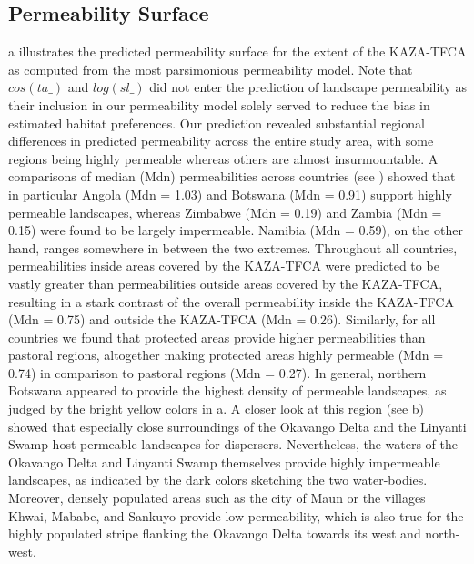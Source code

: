 \documentclass[abstract=on,10pt,a4paper,bibliography=totocnumbered]{scrartcl}
\begin{document}
\subsection{Permeability Surface}
a illustrates the predicted permeability surface for the
extent of the KAZA-TFCA as computed from the most parsimonious permeability
model. Note that \(cos(ta\_)\) and \(log(sl\_)\) did not enter the prediction of
landscape permeability as their inclusion in our permeability model solely
served to reduce the bias in estimated habitat preferences. Our prediction
revealed substantial regional differences in predicted permeability across the
entire study area, with some regions being highly permeable whereas others are
almost insurmountable. A comparisons of median (Mdn) permeabilities across
countries (see ) showed that in particular Angola (Mdn =
1.03) and Botswana (Mdn = 0.91) support highly permeable landscapes, whereas
Zimbabwe (Mdn = 0.19) and Zambia (Mdn = 0.15) were found to be largely
impermeable. Namibia (Mdn = 0.59), on the other hand, ranges somewhere in
between the two extremes. Throughout all countries, permeabilities inside areas
covered by the KAZA-TFCA were predicted to be vastly greater than permeabilities
outside areas covered by the KAZA-TFCA, resulting in a stark contrast of the
overall permeability inside the KAZA-TFCA (Mdn = 0.75) and outside the KAZA-TFCA
(Mdn = 0.26). Similarly, for all countries we found that protected areas provide
higher permeabilities than pastoral regions, altogether making protected areas
highly permeable (Mdn = 0.74) in comparison to pastoral regions (Mdn = 0.27). In
general, northern Botswana appeared to provide the highest density of permeable
landscapes, as judged by the bright yellow colors in a. A
closer look at this region (see b) showed that especially
close surroundings of the Okavango Delta and the Linyanti Swamp host permeable
landscapes for dispersers. Nevertheless, the waters of the Okavango Delta and
Linyanti Swamp themselves provide highly impermeable landscapes, as indicated by
the dark colors sketching the two water-bodies. Moreover, densely populated
areas such as the city of Maun or the villages Khwai, Mababe, and Sankuyo
provide low permeability, which is also true for the highly populated stripe
flanking the Okavango Delta towards its west and north-west.
\end{document}
